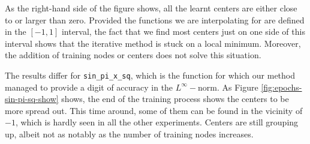 \documentclass[12pt]{report} %
\begin{document}
As the right-hand side of the figure shows, all the learnt centers are either close to or larger than zero. Provided the functions we are interpolating for are defined in the $[-1,1]$ interval, the fact that we find most centers just on one side of this interval shows that the iterative method is stuck on a local minimum. Moreover, the addition of training nodes or centers does not solve this situation.

The results differ for \texttt{sin\_pi\_x\_sq}, which is the function for which our method managed to provide a digit of accuracy in the $L^\infty-$norm. As Figure \ref{fig:epochs-sin-pi-sq-show} shows, the end of the training process shows the centers to be more spread out. This time around, some of them can be found in the vicinity of $-1$, which is hardly seen in all the other experiments. Centers are still grouping up, albeit not as notably as the number of training nodes increases.
\end{document}
